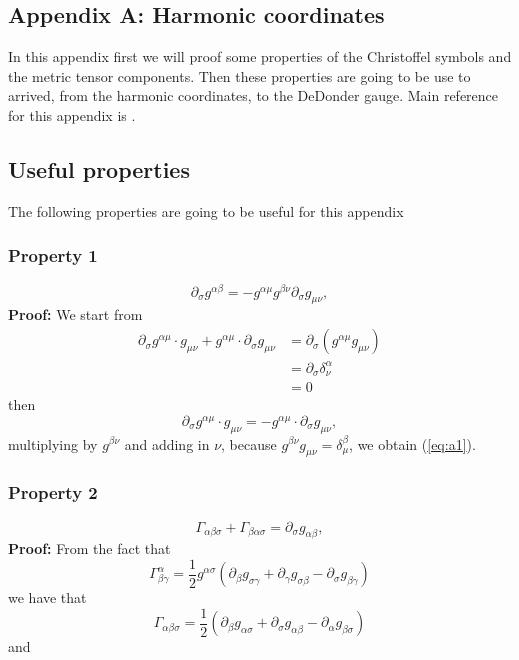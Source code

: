 \begin{appendix}
\chapter{Appendix A: Harmonic coordinates}\label{appendix-harm}
In this appendix first we will proof some properties of the Christoffel symbols and the metric tensor components. Then these properties are going to be
use to arrived, from the harmonic coordinates, to the DeDonder gauge.
Main reference for this appendix is \cite{DIRAC}.

\section{Useful properties}

The following properties are going to be useful for this appendix

\subsection*{Property 1}

\begin{equation}
\partial_{\sigma}g^{\alpha\beta}=-g^{\alpha\mu}g^{\beta\nu}\partial_{\sigma}g_{\mu\nu},\label{eq:a1}
\end{equation}
\textbf{Proof:} We start from
\begin{align*}
\partial_{\sigma}g^{\alpha\mu}\cdot g_{\mu\nu}+g^{\alpha\mu}\cdot\partial_{\sigma}g_{\mu\nu} & =\partial_{\sigma}\left(g^{\alpha\mu}g_{\mu\nu}\right)\\
\  & =\partial_{\sigma}\delta_{\nu}^{\alpha}\\
\  & =0
\end{align*}
then
\[
\partial_{\sigma}g^{\alpha\mu}\cdot g_{\mu\nu}=-g^{\alpha\mu}\cdot\partial_{\sigma}g_{\mu\nu},
\]
multiplying by $g^{\beta\nu}$ and adding in $\nu$, because $g^{\beta\nu}g_{\mu\nu}=\delta_{\mu}^{\beta}$,
we obtain (\ref{eq:a1}).

\subsection*{Property 2}

\begin{equation}
\Gamma_{\alpha\beta\sigma}+\Gamma_{\beta\alpha\sigma}=\partial_{\sigma}g_{\alpha\beta},\label{eq:a2}
\end{equation}
\textbf{Proof:} From the fact that
\[
\Gamma_{\beta\gamma}^{\alpha}=\frac{1}{2}g^{\alpha\sigma}\left(\partial_{\beta}g_{\sigma\gamma}+\partial_{\gamma}g_{\sigma\beta}-\partial_{\sigma}g_{\beta\gamma}\right)
\]
we have that
\[
\Gamma_{\alpha\beta\sigma}=\frac{1}{2}\left(\partial_{\beta}g_{\alpha\sigma}+\partial_{\sigma}g_{\alpha\beta}-\partial_{\alpha}g_{\beta\sigma}\right)
\]
and


\end{appendix}
